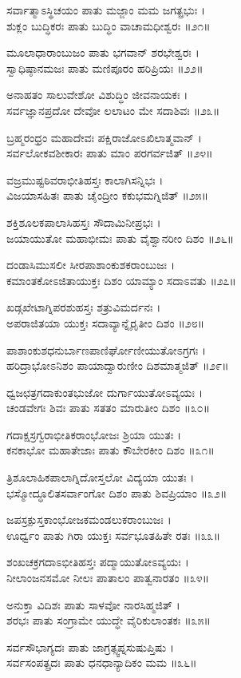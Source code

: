 ಸರ್ವಾತ್ಮಾಽಸ್ಥಿಚಯಂ ಪಾತು ಮಜ್ಜಾಂ ಮಮ ಜಗತ್ಪ್ರಭುಃ ।\\
ಶುಕ್ಲಂ ಬುದ್ಧಿಕರಃ ಪಾತು ಬುದ್ಧಿಂ ವಾಚಾಮಧೀಶ್ವರಃ ॥೨೧॥

ಮೂಲಾಧಾರಾಂಬುಜಂ ಪಾತು ಭಗವಾನ್ ಶರಭೇಶ್ವರಃ ।\\
ಸ್ವಾಧಿಷ್ಠಾನಮಜಃ ಪಾತು ಮಣಿಪೂರಂ ಹರಿಪ್ರಿಯಃ ॥೨೨॥

ಅನಾಹತಂ ಸಾಲುವೇಶೋ ವಿಶುದ್ಧಿಂ ಜೀವನಾಯಕಃ ।\\
ಸರ್ವಜ್ಞಾನಪ್ರದೋ ದೇವೋ ಲಲಾಟಂ ಮೇ ಸದಾಶಿವಃ ॥೨೩॥

ಬ್ರಹ್ಮರಂಧ್ರಂ ಮಹಾದೇವಃ ಪಕ್ಷಿರಾಜೋಽಖಿಲಾತ್ಮವಾನ್ ।\\
ಸರ್ವಲೋಕವಶೀಕಾರಃ ಪಾತು ಮಾಂ ಪರಗರ್ವಜಿತ್ ॥೨೪॥

ವಜ್ರಮುಷ್ಟಠಿವರಾಭೀತಿಹಸ್ತಃ ಕಾಲಾಗಿಸನ್ನಿಭಃ ।\\
ವಿಜಯಾಸಹಿತಃ ಪಾತು ಚೈಂದ್ರೀಂ ಕಕುಭಮಗ್ನಿಜಿತ್ ॥೨೫॥

ಶಕ್ತಿಶೂಲಕಪಾಲಾಸಿಹಸ್ತಃ ಸೌದಾಮಿನೀಪ್ರಭಃ ।\\
ಜಯಾಯುತೋ ಮಹಾಭೀಮಃ ಪಾತು ವೈಶ್ವಾನರೀಂ ದಿಶಂ ॥೨೬॥

ದಂಡಾಸಿಮುಸಲೀ ಸೀರಪಾಶಾಂಕುಶಕರಾಂಬುಜಃ ।\\
ಕಮಾಂತಕೋಽಜಿತಾಯುಕ್ತಃ ದಿಶಂ ಯಾಮ್ಯಾಂ ಸದಾಽವತು ॥೨೭॥

ಖಡ್ಗಖೇಟಾಗ್ನಿಪರಶುಹಸ್ತಃ ಶತ್ರುವಿಮರ್ದನಃ ।\\
ಅಪರಾಜಿತಯಾ ಯುಕ್ತಃ ಸದಾವ್ಯಾನ್ನೈರೃತೀಂ ದಿಶಂ ॥೨೮॥

ಪಾಶಾಂಕುಶಧನುರ್ಬಾಣಪಾಣಿರ್ಘೋಣೀಯುತೋಽಗ್ರಗಃ ।\\
ಹರಿದ್ರಾಭೋಽನಿಶಂ ಪಾಯಾದ್ವಾರುಣೀಂ ದಿಶಮಾತ್ಮಜಿತ್ ॥೨೯॥

ಧ್ವಜಛತ್ರಗದಾಕುಂತಭುಜೋ ದುರ್ಗಾಯುತೋಽವ್ಯಯಃ ।\\
ಚಂಡವೇಗಃ ಶಿವಃ ಪಾತು ಸತತಂ ಮಾರುತೀಂ ದಿಶಂ ॥೩೦॥

ಗದಾಕ್ಷಸ್ರಗ್ವರಾಭೀತಿಕರಾಂಭೋಜಃ ಶ್ರಿಯಾ ಯುತಃ ।\\
ಕನಕಾಭೋ ಮಹಾತೇಜಾಃ ಪಾತು ಕೌಬೇರಕೀಂ ದಿಶಂ ॥೩೧॥

ತ್ರಿಶೂಲಾಹಿಕಪಾಲಾಗ್ನಿದೋಸ್ತಲೋ ವಿದ್ಯಯಾ ಯುತಃ ।\\
ಭಸ್ಮೋದ್ಧೂಲಿತಸರ್ವಾಂಗೋ ದಿಶಂ ಪಾತು ಶಿವಪ್ರಿಯಾಂ ॥೩೨॥

ಜಪಸ್ರಕ್ಪುಸ್ತಕಾಂಭೋಜಕಮಂಡಲುಕರಾಂಬುಜಃ ।\\
ಊರ್ಧ್ವಂ ಪಾತು ಗಿರಾ ಯುಕ್ತಃ ಸರ್ವಭೂತಹಿತೇ ರತಃ ॥೩೩॥

ಶಂಖಚಕ್ರಗದಾಽಭೀತಿಹಸ್ತಃ ಪದ್ಮಾಯುತೋಽವ್ಯಯಃ ।\\
ನೀಲಾಂಜನಸಮೋ ನೀಲಃ ಪಾತಾಲಂ ಪಾತ್ವನಾರತಂ ॥೩೪॥

ಅನುಕ್ತಾ ವಿದಿಶಃ ಪಾತು ಸಾಳವೋ ನಾರಸಿಹ್ಮಜಿತ್ ।\\
ಶರಭಃ ಪಾತು ಸಂಗ್ರಾಮೇ ಯುದ್ಧೇ ವೈರಿಕುಲಾಂತಕಃ ॥೩೫॥

ಸರ್ವಸೌಭಾಗ್ಯದಃ ಪಾತು ಜಾಗ್ರತ್ಸ್ವಪ್ನಸುಷುಪ್ತಿಷು ।\\
ಸರ್ವಸಂಪತ್ಪ್ರದಃ ಪಾತು ಧನಧಾನ್ಯಾದಿಕಂ ಮಮ ॥೩೬॥

